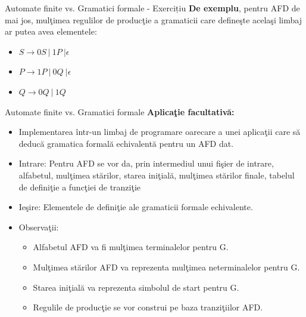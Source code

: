 \documentclass[pdf]{beamer}
\begin{document}
\begin{frame}{Automate finite vs. Gramatici formale - Exercițiu}
\textbf{De exemplu}, pentru AFD de mai jos, mulţimea regulilor de producţie a gramaticii care defineşte acelaşi limbaj ar putea avea elementele:

\begin{center}
\end{center}

\begin{itemize}
\item
$S \rightarrow 0S \ | \ 1P \ | \epsilon$
\item
$P \rightarrow 1P \ | \ 0Q \ | \epsilon$
\item
$Q \rightarrow 0Q \ | \ 1Q$
\end{itemize}
\end{frame}



\begin{frame}{Automate finite vs. Gramatici formale}
\textbf{Aplicaţie facultativă:}

\begin{itemize}
\item Implementarea într-un limbaj de programare oarecare a unei aplicaţii care să deducă gramatica formală echivalentă pentru un AFD dat.

\item Intrare: Pentru AFD se vor da, prin intermediul unui fişier de intrare, alfabetul, mulţimea stărilor, starea iniţială, mulţimea stărilor finale, tabelul de definiţie a funcţiei de tranziţie

\item Ieşire: Elementele de definiţie ale gramaticii formale echivalente.

\item Observaţii: 

\begin{itemize}
\item Alfabetul AFD va fi mulţimea terminalelor pentru G.

\item Mulţimea stărilor AFD va reprezenta mulţimea neterminalelor pentru G.

\item Starea iniţială va reprezenta simbolul de start pentru G.

\item Regulile de producţie se vor construi pe baza tranziţiilor AFD.
\end{itemize}
\end{itemize}
\end{frame}
\end{document}
